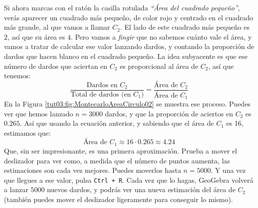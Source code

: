 \documentclass[10pt,a4paper]{article}\usepackage[]{graphicx}\usepackage[]{color}
\newcounter {cont01}
\begin{document}
Si ahora marcas con el ratón la casilla rotulada {\em ``Área del cuadrado pequeño''}, verás aparecer un cuadrado más pequeño, de color rojo y centrado en el cuadrado más grande, al que vamos a llamar $C_2$. El lado de este cuadrado más pequeño es $2$, así que su área es $4$. Pero vamos a {\em fingir} que no sabemos cuánto vale el área, y vamos a tratar de calcular ese valor lanzando dardos, y contando la proporción de dardos que hacen blanco en el cuadrado pequeño. La idea subyacente es que ese número de dardos que aciertan en $C_2$ es proporcional al área de $C_2$, así que tenemos:
\[
\dfrac{\mbox{Dardos en $C_2$}}{\mbox{Total de dardos (en $C_1$)}} =
\dfrac{\mbox{Área de $C_2$}}{\mbox{Área de $C_1$}}
\]
En la Figura \ref{tut03:fig:MontecarloAreaCirculo02} se muestra ese proceso. Puedes ver que hemos lanzado $n=3000$ dardos, y que la proporción de aciertos en $C_2$ es $0.265$. Así que usando la ecuación anterior, y sabiendo que el área de $C_1$ es 16, estimamos que:
\[
\mbox{Área de $C_1$} \approx 16\cdot 0.265\approx 4.24
\]
Que, sin ser impresionante, es una primera aproximación. Prueba a mover el deslizador para ver como,  a medida que el número de puntos aumenta, las estimaciones son cada vez mejores. Puedes moverlos hasta $n=5000$. Y una vez que llegues a ese valor, pulsa {\tt Ctrl + R}. Cada vez que lo hagas, GeoGebra volverá a lanzar $5000$ nuevos dardos, y podrás ver una nueva estimación del área de $C_2$ (también puedes mover el deslizador ligeramente para conseguir lo mismo).
\end{document}
